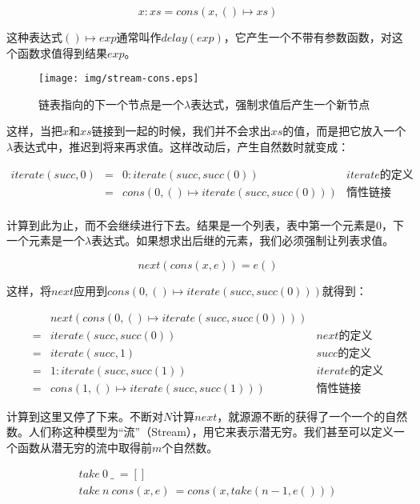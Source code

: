\documentclass{article}
\begin{document}
\[
x : xs = cons(x, () \mapsto xs)
\]

这种表达式$() \mapsto exp$通常叫作$delay(exp)$，它产生一个不带有参数函数，对这个函数求值得到结果$exp$。

\begin{figure}[htbp]
 \centering
 \texttt{[image: img/stream-cons.eps]}
 \caption{链表指向的下一个节点是一个$\lambda$表达式，强制求值后产生一个新节点}
 \label{fig:stream-cons}
\end{figure}

这样，当把$x$和$xs$链接到一起的时候，我们并不会求出$xs$的值，而是把它放入一个$\lambda$表达式中，推迟到将来再求值。这样改动后，产生自然数时就变成：

\[
\begin{array}{rcll}
iterate(succ, 0) & = & 0 : iterate(succ, succ(0)) & iterate\text{的定义}\\
                 & = & cons(0, () \mapsto iterate(succ, succ(0))) & \text{惰性链接} \\
\end{array}
\]

计算到此为止，而不会继续进行下去。结果是一个列表，表中第一个元素是0，下一个元素是一个$\lambda$表达式。如果想求出后继的元素，我们必须强制让列表求值。

\[
next(cons(x, e)) = e()
\]

这样，将$next$应用到$cons(0, () \mapsto iterate(succ, succ(0)))$就得到：

\[
\begin{array}{cll}
  & next(cons(0, () \mapsto iterate(succ, succ(0)))) & \\
= & iterate(succ, succ(0)) & next\text{的定义} \\
= & iterate(succ, 1) & succ\text{的定义} \\
= & 1 : iterate(succ, succ(1)) & iterate\text{的定义} \\
= & cons(1, () \mapsto iterate(succ, succ(1))) & \text{惰性链接}
\end{array}
\]

计算到这里又停了下来。不断对$N$计算$next$，就源源不断的获得了一个一个的自然数。人们称这种模型为“流”（Stream），用它来表示潜无穷。我们甚至可以定义一个函数从潜无穷的流中取得前$m$个自然数。

\[
\begin{array}{l}
take\ 0\ \_\ = [] \\
take\ n\ cons(x, e)\ = cons(x, take(n-1, e())) \\
\end{array}
\]
\end{document}

